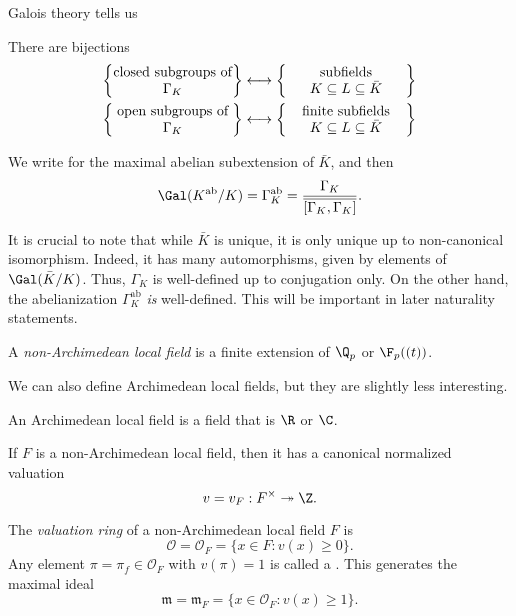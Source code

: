 \documentclass[a4paper]{article}
\newcommand\ab{\mathrm{ab}}
\begin{document}
Galois theory tells us
\begin{thm}
  There are bijections
  \begin{align*}
    \left\{\parbox{3cm}{\centering closed subgroups of $\Gamma_K$}\right\} &\longleftrightarrow \left\{\parbox{3cm}{\centering subfields $K \subseteq L \subseteq \bar{K}$}\right\}\\
    \left\{\parbox{3cm}{\centering open subgroups of $\Gamma_K$}\right\} &\longleftrightarrow \left\{\parbox{3cm}{\centering finite subfields $K \subseteq L \subseteq \bar{K}$}\right\}
  \end{align*}
\end{thm}

\begin{notation}
  We write \term{$K^{\ab}$} for the maximal abelian subextension of $\bar{K}$, and then
  \[
    \Gal(K^{\ab}/K) = \Gamma_K^{\ab} = \frac{\Gamma_K}{\overline{[\Gamma_K, \Gamma_K]}}.
  \]
\end{notation}
It is crucial to note that while $\bar{K}$ is unique, it is only unique up to non-canonical isomorphism. Indeed, it has many automorphisms, given by elements of $\Gal(\bar{K}/K)$. Thus, $\Gamma_K$ is well-defined up to conjugation only. On the other hand, the abelianization $\Gamma_K^{\ab}$ \emph{is} well-defined. This will be important in later naturality statements.

\begin{defi}
  A \emph{non-Archimedean local field} is a finite extension of $\Q_p$ or $\F_p((t))$.
\end{defi}
We can also define Archimedean local fields, but they are slightly less interesting.
\begin{defi}
  An Archimedean local field is a field that is $\R$ or $\C$.
\end{defi}

If $F$ is a non-Archimedean local field, then it has a canonical normalized valuation
\[
  v = v_F: F^\times \twoheadrightarrow \Z.
\]
\begin{defi}
  The \emph{valuation ring} of a non-Archimedean local field $F$ is
  \[
    \mathcal{O} = \mathcal{O}_F = \{x \in F : v(x) \geq 0\}.
  \]
  Any element $\pi = \pi_f \in \mathcal{O}_F$ with $v(\pi) = 1$ is called a . This generates the maximal ideal
  \[
    \mathfrak{m} = \mathfrak{m}_F = \{x \in \mathcal{O}_F: v(x) \geq 1\}.
  \]
\end{defi}
\end{document}
